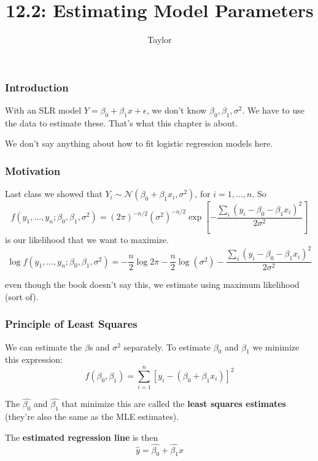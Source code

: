 \documentclass{beamer}
\title["12.2"]{12.2: Estimating Model Parameters}
\author{Taylor}
\institute[UVA] 
{
University of Virginia \\
\medskip
\textit{} 
}
\date{}
\begin{document}

\begin{frame}
\titlepage 
\end{frame}
\begin{frame}
\frametitle{Introduction}

With an SLR model $Y = \beta_0 + \beta_1 x + \epsilon$, we don't know $\beta_0, \beta_1, \sigma^2$. We have to use the data to estimate these. That's what this chapter is about.
\newline

We don't say anything about how to fit logistic regression models here.

\end{frame}
\begin{frame}
\frametitle{Motivation}

Last class we showed that $Y_i \sim \mathcal{N}(\beta_0 + \beta_1 x_i, \sigma^2)$, for $i = 1, \ldots, n$. So
\[
f(y_1, \ldots, y_n ; \beta_0, \beta_1, \sigma^2) = (2 \pi)^{-n/2} (\sigma^2)^{-n/2} \exp \left[ - \frac{\sum_i(y_i - \beta_0 - \beta_1 x_i)^2 }{2 \sigma^2} \right]
\]
is our likelihood that we want to maximize. 
\[
\log f(y_1, \ldots, y_n ; \beta_0, \beta_1, \sigma^2) = -\frac{n}{2}\log 2 \pi -\frac{n}{2} \log(\sigma^2) -  \frac{\sum_i(y_i - \beta_0 - \beta_1 x_i)^2 }{2 \sigma^2}
\]

even though the book doesn't say this, we estimate using maximum likelihood (sort of).

\end{frame}
\begin{frame}
\frametitle{Principle of Least Squares}

We can estimate the $\beta$s and $\sigma^2$ separately. To estimate $\beta_0$ and $\beta_1$ we minimize this expression:
\[
f(\beta_0, \beta_1) = \sum_{i=1}^n \left[ y_i - (\beta_0 + \beta_1 x_i)\right]^2
\]

The $\hat{\beta_0}$ and $\hat{\beta_1}$ that minimize this are called the \textbf{least squares estimates} (they're also the same as the MLE estimates).
\newline

The \textbf{estimated regression line} is then
\[
\hat{y} = \hat{\beta_0} + \hat{\beta_1}x 
\]

\end{frame}
\end{document}
